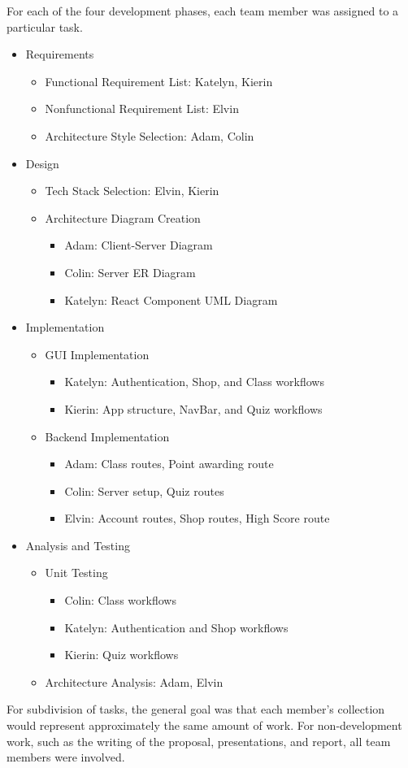 For each of the four development phases, each team member was assigned to a  particular task.

\begin{itemize}
    \item Requirements
    \begin{itemize}
        \item Functional Requirement List: Katelyn, Kierin
        \item Nonfunctional Requirement List: Elvin
        \item Architecture Style Selection: Adam, Colin
    \end{itemize}
    \item Design
    \begin{itemize}
        \item Tech Stack Selection: Elvin, Kierin
        \item Architecture Diagram Creation
        \begin{itemize}
            \item Adam: Client-Server Diagram
            \item Colin: Server ER Diagram
            \item Katelyn: React Component UML Diagram
        \end{itemize}
    \end{itemize}
    \item Implementation
    \begin{itemize}
        \item GUI Implementation
         \begin{itemize}
            \item Katelyn: Authentication, Shop, and Class workflows
            \item Kierin: App structure, NavBar, and Quiz workflows
        \end{itemize}
        \item Backend Implementation
        \begin{itemize}
            \item Adam: Class routes, Point awarding route
            \item Colin: Server setup, Quiz routes
            \item Elvin: Account routes, Shop routes, High Score route
        \end{itemize}
    \end{itemize}
    \item Analysis and Testing
    \begin{itemize}
        \item Unit Testing
         \begin{itemize}
            \item Colin: Class workflows
            \item Katelyn: Authentication and Shop workflows
            \item Kierin: Quiz workflows
        \end{itemize}
        \item Architecture Analysis: Adam, Elvin
    \end{itemize}
\end{itemize}

For subdivision of tasks, the general goal was that each member's collection would represent approximately the same amount of work. For non-development work, such as the writing of the proposal, presentations, and report, all team members were involved.